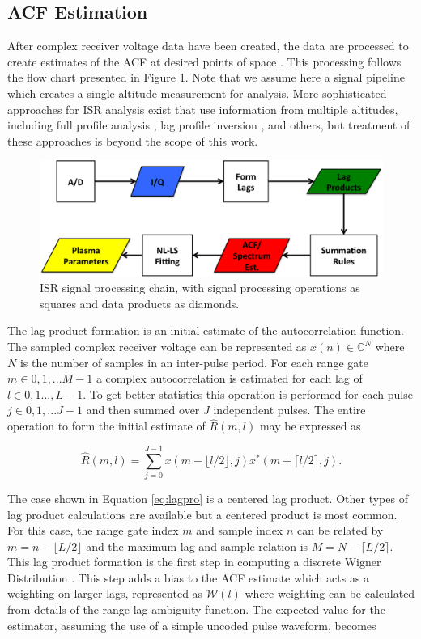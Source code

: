 \documentclass[draft,ras]{agutex}
\begin{document}
\begin{article}
\subsection{ACF Estimation}
\label{sec:acf}
After complex receiver voltage data have been created, the data are processed to create estimates of the ACF at desired points of space \citep[see, e.g.,][]{farley1969,nygren1996}. This processing follows the flow chart presented in Figure \ref{fig:chain}.  Note that we assume here a signal pipeline which creates a single altitude measurement for analysis.  More sophisticated approaches for ISR analysis exist that use information from multiple altitudes, including full profile analysis \citep{RDS:RDS3308}, lag profile inversion \citep{Virtanen:20082vx}, and others, but treatment of these approaches is beyond the scope of this work.

\begin{figure}[!t]
\centering
\includegraphics[width=6in]{datastackchain}
\caption{ISR signal processing chain, with signal processing operations as squares and data products as diamonds.}
\label{fig:chain}
\end{figure}


The lag product formation is an initial estimate of the autocorrelation function. The sampled complex receiver voltage can be represented as $x(n) \in\mathbb{C}^N$ where $N$ is the number of samples in an inter-pulse period. For each range gate $m\in 0,1,...M-1$ a complex autocorrelation is estimated for each lag of $l \in 0,1...,L-1$.  To get better statistics this operation is performed for each pulse $j\in 0,1,...J-1$ and then summed over $J$ independent pulses. The entire operation to form the initial estimate of $\widehat{R}(m,l)$ may be expressed as

\begin{equation}
\label{eq:lagpro}
\widehat{R}(m,l) = \displaystyle\sum\limits_{j=0}^{J-1} x(m-\lfloor l/2\rfloor,j)x^*(m+\lceil l/2 \rceil,j).
\end{equation}

The case shown in Equation \ref{eq:lagpro} is a centered lag product.  Other types of lag product calculations are available but a centered product is most common. For this case, the range gate index $m$ and sample index $n$ can be related by $m=n-\lfloor L/2\rfloor$ and the maximum lag and sample relation is $M=N-\lceil L/2 \rceil$.  This lag product formation is the first step in computing a discrete Wigner Distribution \citep{TFAcohen}. This  step adds a bias to the ACF estimate which acts as a weighting on larger lags, represented as $\mathcal{W}(l)$ where weighting can be calculated from details of the range-lag ambiguity function. The expected value for the estimator, assuming the use of a simple uncoded pulse waveform, becomes


\end{article}
\end{document}

